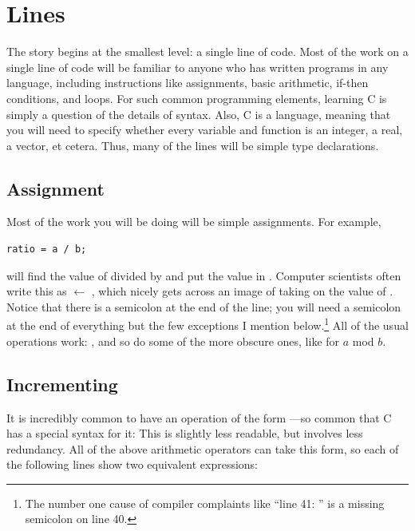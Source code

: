 \section{Lines} \label{fncontents}

The story begins at the smallest level: a single line of code. Most of
the work on a single line of code will be familiar to anyone who has
written programs in any language, including instructions like assignments,
basic arithmetic, if-then conditions, and loops. For such common
programming elements, learning C is simply a question of the details
of syntax. Also, C is a  language, meaning that you will
need to specify whether every variable and function is an integer,
a real, a vector, et cetera. Thus, many of the lines will be simple
type declarations.

\subsection{Assignment}   \index{=}
Most of the work you will be doing will be simple assignments. For example,
\begin{lstlisting}
ratio = a / b;
\end{lstlisting}

\noindent
will find the value of  divided by  and put the
value in . Computer scientists often write this as 
$\leftarrow$ , which nicely gets across an image of 
taking on the value of . Notice that there is a semicolon at the end of
the line; you will need a semicolon at the end of everything but the few
exceptions I mention below.\footnote{The number one cause of compiler
complaints like ``line 41: '' is a missing semicolon on line 40.} All of the usual operations work: \ci{+
- / *}, and so do some of the more obscure ones, like 
for $a$ mod $b$.  \index{\%}

\subsection{Incrementing} It is incredibly common to have an operation of the form ---so
common that C has a special syntax for it:  This is slightly less readable, but involves less
redundancy. All of the above arithmetic operators can take this form, so each of the following lines show two
equivalent expressions: \\


